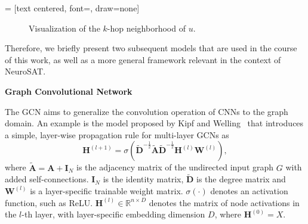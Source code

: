  = [text centered, font=\small, draw=none]
\begin{figure}
    \centering
    \caption[$k$-hop neighborhood visualization]{Visualization of the $k$-hop neighborhood of $u$.}
    \label{fig:k-hop}
\end{figure}

Therefore, we briefly present two subsequent models that are used in the course of this work, as well as a more general framework relevant in the context of NeuroSAT. \bigskip

\textbf{Graph Convolutional Network} \par
The \ac{GCN} aims to generalize the convolution operation of \acp{CNN} to the graph domain. An example is the model proposed by Kipf and Welling~\cite{kipf2016semi} that introduces a simple, layer-wise propagation rule for multi-layer GCNs as
\begin{equation}
    \label{eq:GCN}
    \mathbf{H}^{(l+1)} = \sigma(\tilde{\mathbf{D}}^{-\frac{1}{2}}\tilde{\mathbf{A}}\tilde{\mathbf{D}}^{-\frac{1}{2}}\mathbf{H}^{(l)}\mathbf{W}^{(l)}),
\end{equation}
where $\tilde{\mathbf{A}} = \mathbf{A} + \mathbf{I}_N$ is the adjacency matrix of the undirected input graph $G$ with added self-connections. $\mathbf{I}_N$ is the identity matrix, $\tilde{\mathbf{D}}$ is the degree matrix and $\mathbf{W}^{(l)}$ is a layer-specific trainable weight matrix. $\sigma(\cdot)$ denotes an activation function, such as ReLU. $\mathbf{H}^{(l)} \in \mathbb{R}^{n\times D}$ denotes the matrix of node activations in the $l$-th layer, with layer-specific embedding dimension $D$, where $\mathbf{H}^{(0)} = X$. 

